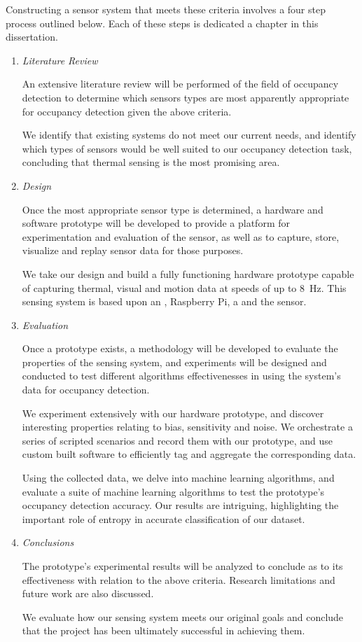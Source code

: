 \documentclass[../thesis/thesis.tex]{subfiles}
\begin{document}
Constructing a sensor system that meets these criteria involves a four step process outlined below. Each of these steps is dedicated a chapter in this dissertation.
\begin{enumerate}
\item \emph{Literature Review}

An extensive literature review will be performed of the field of occupancy detection to determine which sensors types are most apparently appropriate for occupancy detection given the above criteria.

We identify that existing systems do not meet our current needs, and identify which types of sensors would be well suited to our occupancy detection task, concluding that thermal sensing is the most promising area.

\item \emph{Design}

Once the most appropriate sensor type is determined, a hardware and software prototype will be developed to provide a platform for experimentation and evaluation of the sensor, as well as to capture, store, visualize and replay sensor data for those purposes.

We take our design and build a fully functioning hardware prototype capable of capturing thermal, visual and motion data at speeds of up to 8~Hz. This sensing system is based upon an \ard, Raspberry Pi, a \pir and the \mlx sensor.

\item \emph{Evaluation}

Once a prototype exists, a methodology will be developed to evaluate the properties of the sensing system, and experiments will be designed and conducted to test different algorithms effectivenesses in using the system's data for occupancy detection.

We experiment extensively with our hardware prototype, and discover interesting properties relating to bias, sensitivity and noise. We orchestrate a series of scripted scenarios and record them with our prototype, and use custom built software to efficiently tag and aggregate the corresponding data.

Using the collected data, we delve into machine learning algorithms, and evaluate a suite of machine learning algorithms to test the prototype's occupancy detection accuracy. Our results are intriguing, highlighting the important role of entropy in accurate classification of our dataset.

\item \emph{Conclusions}

The prototype's experimental results will be analyzed to conclude as to its effectiveness with relation to the above criteria. Research limitations and future work are also discussed.

We evaluate how our sensing system meets our original goals and conclude that the project has been ultimately successful in achieving them.
\end{enumerate}

 
\end{document}
